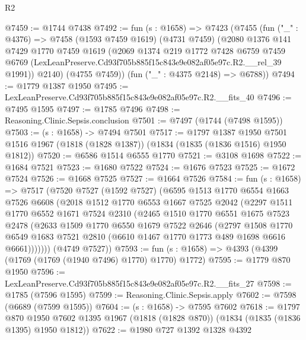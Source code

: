 \begin{lexlean}{R2}
\begin{coremodule}
@7459 := @1744 @7438
@7492 := fun (s : @1658) =>
  @7423
    (@7455
      (fun ("_" : @4376) =>
      @7458
        (@1593 @7459 @1619)
        (@4731 @7459)
        (@2080
          @1376
          @141
          @7429
          @1770
          @7459
          @1619
          (@2069
            @1374
            @219
            @1772
            @7428
            @6759
            @7459
            @6769
            (LexLeanPreserve.Cd93f705b885f15c843e9e082af05e97c.R2.__rel_39 @1991))
          @2140)
        (@4755 @7459))
      (fun ("_" : @4375 @2148) => @6788))
@7494 := @1779 @1387 @1950
@7495 := LexLeanPreserve.Cd93f705b885f15c843e9e082af05e97c.R2.__fits_40
@7496 := @7495 @1595
@7497 := @1785 @7496
@7498 := Reasoning.Clinic.Sepsis.conclusion
@7501 := @7497 (@1744 (@7498 @1595))
@7503 := (s : @1658) -> @7494 @7501
@7517 := @1797
    @1387
    @1950
    @7501
    @1516
    @1967
    (@1818 (@1828 @1387))
    (@1834 (@1835 (@1836 @1516) @1950 @1812))
@7520 := @6586 @1514 @6555 @1770
@7521 := @3108 @1698
@7522 := @1684 @7521
@7523 := @1680 @7522
@7524 := @1676 @7523
@7525 := @1672 @7524
@7526 := @1668 @7525
@7527 := @1664 @7526
@7584 := fun (s : @1658) =>
  @7517
    (@7520
      @7527
      (@1592 @7527)
      (@6595
        @1513
        @1770
        @6554
        @1663
        @7526
        @6608
        (@2018
          @1512
          @1770
          @6553
          @1667
          @7525
          @2042
          (@2297
            @1511
            @1770
            @6552
            @1671
            @7524
            @2310
            (@2465
              @1510
              @1770
              @6551
              @1675
              @7523
              @2478
              (@2633
                @1509
                @1770
                @6550
                @1679
                @7522
                @2646
                (@2797
                  @1508
                  @1770
                  @6549
                  @1683
                  @7521
                  @2810
                  (@6610 @1467 @1770 @1773 @489 @1698 @6616 @6661)))))))
      (@4749 @7527))
@7593 := fun (s : @1658) => @4393 (@4399 (@1769 (@1769 (@1940 @7496) @1770) @1770) @1772)
@7595 := @1779 @870 @1950
@7596 := LexLeanPreserve.Cd93f705b885f15c843e9e082af05e97c.R2.__fits_27
@7598 := @1785 (@7596 @1595)
@7599 := Reasoning.Clinic.Sepsis.apply
@7602 := @7598 (@6689 (@7599 @1595))
@7604 := (s : @1658) -> @7595 @7602
@7618 := @1797
    @870
    @1950
    @7602
    @1395
    @1967
    (@1818 (@1828 @870))
    (@1834 (@1835 (@1836 @1395) @1950 @1812))
@7622 := @1980 @727 @1392 @1328 @4392

\end{coremodule}
\end{lexlean}
